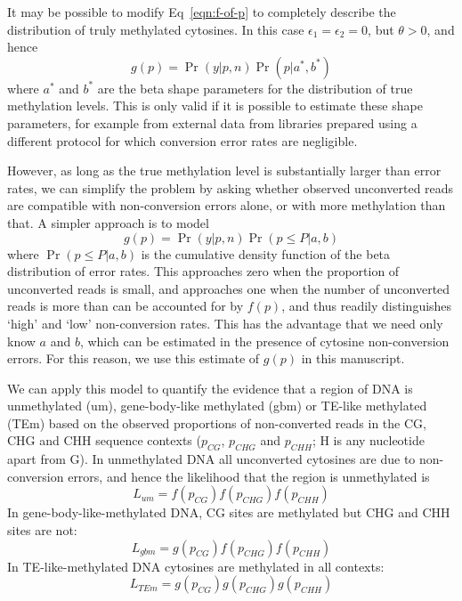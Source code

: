 \documentclass[10pt,draft,letterpaper]{article}
\begin{document}
It may be possible to modify Eq~\ref{eqn:f-of-p} to completely describe the distribution of truly methylated cytosines.
In this case $\epsilon_1=\epsilon_2=0$, but $\theta>0$, and hence
\begin{equation}
    g(p) = \Pr(y | p, n) \Pr(p | a^*,b^*)
\end{equation}
where $a^*$ and $b^*$ are the beta shape parameters for the distribution of true methylation levels.
This is only valid if it is possible to estimate these shape parameters, for example from external data from libraries prepared using a different protocol for which conversion error rates are negligible.

However, as long as the true methylation level is substantially larger than error rates, we can simplify the problem by asking whether observed unconverted reads are compatible with non-conversion errors alone, or with more methylation than that.
A simpler approach is to model 
\begin{equation}
    g(p) = \Pr(y | p, n) \Pr(p \leq P | a,b)
\end{equation}
where $\Pr(p \leq P | a,b)$ is the cumulative density function of the beta distribution of error rates.
This approaches zero when the proportion of unconverted reads is small, and approaches one when the number of unconverted reads is more than can be accounted for by $f(p)$, and thus readily distinguishes `high' and `low' non-conversion rates.
This has the advantage that we need only know $a$ and $b$, which can be estimated in the presence of cytosine non-conversion errors.
For this reason, we use this estimate of $g(p)$ in this manuscript.

We can apply this model to quantify the evidence that a region of DNA is unmethylated (um), gene-body-like methylated (gbm) or TE-like methylated (TEm) based on the observed proportions of non-converted reads in the CG, CHG and CHH sequence contexts ($p_{CG}$, $p_{CHG}$ and $p_{CHH}$; H is any nucleotide apart from G).
In unmethylated DNA all unconverted cytosines are due to non-conversion errors, and hence the likelihood that the region is unmethylated is
\begin{equation}
    L_{um} = f(p_{CG}) f(p_{CHG}) f(p_{CHH})
\end{equation}
In gene-body-like-methylated DNA, CG sites are methylated but CHG and CHH sites are not: 
\begin{equation}
    L_{gbm} = g(p_{CG}) f(p_{CHG}) f(p_{CHH})
\end{equation}
In TE-like-methylated DNA cytosines are methylated in all contexts:
\begin{equation}
    L_{TEm} = g(p_{CG}) g(p_{CHG}) g(p_{CHH})
\end{equation}
\end{document}
